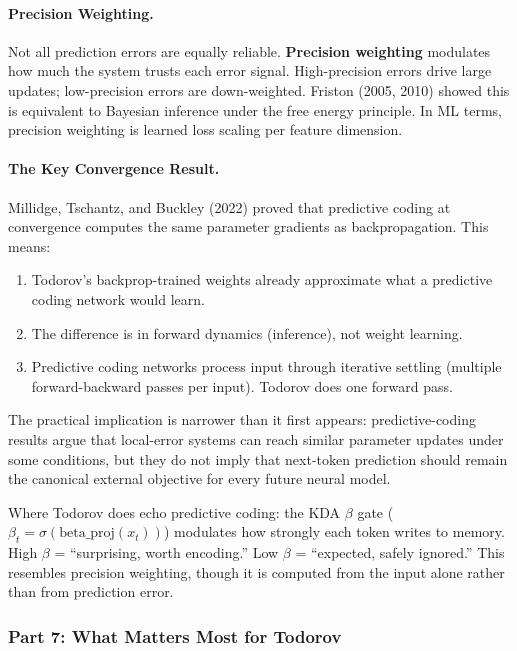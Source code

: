 \documentclass[11pt,a4paper]{article}
\begin{document}
\paragraph{Precision Weighting.}

Not all prediction errors are equally reliable. \textbf{Precision weighting} modulates how much the system trusts each error signal. High-precision errors drive large updates; low-precision errors are down-weighted. Friston (2005, 2010) showed this is equivalent to Bayesian inference under the free energy principle. In ML terms, precision weighting is learned loss scaling per feature dimension.

\paragraph{The Key Convergence Result.}

Millidge, Tschantz, and Buckley (2022) proved that predictive coding at convergence computes the same parameter gradients as backpropagation. This means:
\begin{enumerate}
  \item Todorov's backprop-trained weights already approximate what a predictive coding network would learn.
  \item The difference is in forward dynamics (inference), not weight learning.
  \item Predictive coding networks process input through iterative settling (multiple forward-backward passes per input). Todorov does one forward pass.
\end{enumerate}

The practical implication is narrower than it first appears: predictive-coding results argue that local-error systems can reach similar parameter updates under some conditions, but they do not imply that next-token prediction should remain the canonical external objective for every future neural model.

Where Todorov does echo predictive coding: the KDA $\beta$ gate ($\beta_t = \sigma(\mathrm{beta\_proj}(x_t))$) modulates how strongly each token writes to memory. High $\beta$ = ``surprising, worth encoding.'' Low $\beta$ = ``expected, safely ignored.'' This resembles precision weighting, though it is computed from the input alone rather than from prediction error.

\subsubsection{Part 7: What Matters Most for Todorov}
\end{document}

